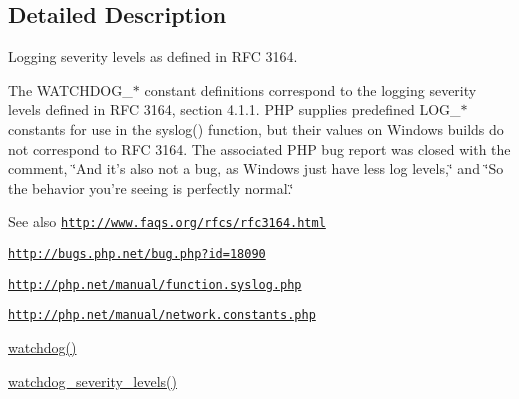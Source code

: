 \subsection{Detailed Description}
Logging severity levels as defined in RFC 3164.

The WATCHDOG\_\-$\ast$ constant definitions correspond to the logging severity levels defined in RFC 3164, section 4.1.1. PHP supplies predefined LOG\_\-$\ast$ constants for use in the syslog() function, but their values on Windows builds do not correspond to RFC 3164. The associated PHP bug report was closed with the comment, \char`\"{}And it's also not a bug, as Windows just have less log levels,\char`\"{} and \char`\"{}So the behavior you're seeing is perfectly normal.\char`\"{}

\begin{DoxySeeAlso}{See also}
\href{http://www.faqs.org/rfcs/rfc3164.html}{\tt http://www.faqs.org/rfcs/rfc3164.html} 

\href{http://bugs.php.net/bug.php?id=18090}{\tt http://bugs.php.net/bug.php?id=18090} 

\href{http://php.net/manual/function.syslog.php}{\tt http://php.net/manual/function.syslog.php} 

\href{http://php.net/manual/network.constants.php}{\tt http://php.net/manual/network.constants.php} 

\hyperlink{bootstrap_8inc_acb7338e6740302727043d64e3ae1257b}{watchdog()} 

\hyperlink{group__logging__severity__levels_gafb5d4b58ec7e483153644c0f664e0ca4}{watchdog\_\-severity\_\-levels()} 
\end{DoxySeeAlso}


